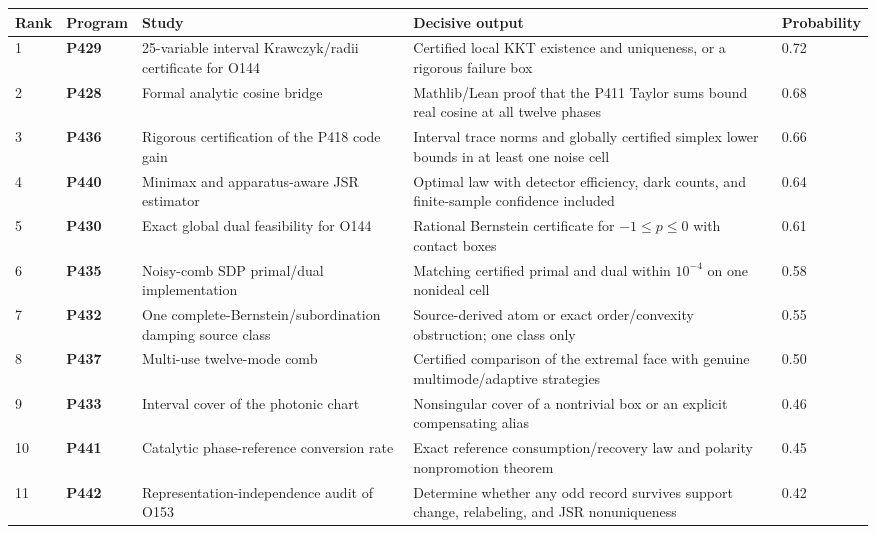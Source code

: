 \documentclass[11pt,a4paper,openany]{report}
\begin{document}
\begin{center}
\begingroup\fontsize{7}{8.4}\selectfont
\setlength{\tabcolsep}{2.5pt}
\renewcommand{\arraystretch}{1.16}
\begin{longtable}{@{}p{}p{}p{}p{}p{}@{}}
\toprule
\textbf{Rank} & \textbf{Program} & \textbf{Study} & \textbf{Decisive output} & \textbf{Probability} \\
\midrule
\endhead
1 & \textbf{P429} & 25-variable interval Krawczyk/\allowbreak{}radii certificate for O144 & Certified local KKT existence and uniqueness, or a rigorous failure box & 0.72 \\
2 & \textbf{P428} & Formal analytic cosine bridge & Mathlib/\allowbreak{}Lean proof that the P411 Taylor sums bound real cosine at all twelve phases & 0.68 \\
3 & \textbf{P436} & Rigorous certification of the P418 code gain & Interval trace norms and globally certified simplex lower bounds in at least one noise cell & 0.66 \\
4 & \textbf{P440} & Minimax and apparatus-aware JSR estimator & Optimal law with detector efficiency, dark counts, and finite-sample confidence included & 0.64 \\
5 & \textbf{P430} & Exact global dual feasibility for O144 & Rational Bernstein certificate for \(-1\le p\le0\) with contact boxes & 0.61 \\
6 & \textbf{P435} & Noisy-comb SDP primal/\allowbreak{}dual implementation & Matching certified primal and dual within \(10^{-4}\) on one nonideal cell & 0.58 \\
7 & \textbf{P432} & One complete-Bernstein/\allowbreak{}subordination damping source class & Source-derived atom or exact order/\allowbreak{}convexity obstruction; one class only & 0.55 \\
8 & \textbf{P437} & Multi-use twelve-mode comb & Certified comparison of the extremal face with genuine multimode/\allowbreak{}adaptive strategies & 0.50 \\
9 & \textbf{P433} & Interval cover of the photonic chart & Nonsingular cover of a nontrivial box or an explicit compensating alias & 0.46 \\
10 & \textbf{P441} & Catalytic phase-reference conversion rate & Exact reference consumption/\allowbreak{}recovery law and polarity nonpromotion theorem & 0.45 \\
11 & \textbf{P442} & Representation-independence audit of O153 & Determine whether any odd record survives support change, relabeling, and JSR nonuniqueness & 0.42 \\

\end{longtable}
\end{center}
\end{document}
